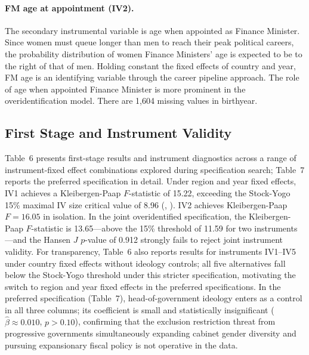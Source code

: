 \documentclass[12pt]{article}
\renewcommand{\citep}[1]{(\textit{\citeauthor{#1}}, \citeyear{#1})}
\begin{document}
\paragraph{FM age at appointment (IV2).}
The secondary instrumental variable is age when appointed as Finance Minister. Since women must queue longer than men to reach their peak political careers, the probability distribution of women Finance Ministers' age is expected to be to the right of that of men. Holding constant the fixed effects of country and year, FM age is an identifying variable through the career pipeline approach. The role of age when appointed Finance Minister is more prominent in the overidentification model. There are 1,604 missing values in birthyear.

\subsection{First Stage and Instrument Validity}

Table~6 presents first-stage results and instrument diagnostics across a range 
of instrument-fixed effect combinations explored during specification search; 
Table~7 reports the preferred specification in detail. Under region and year 
fixed effects, IV1 achieves a Kleibergen-Paap $F$-statistic of 15.22, 
exceeding the Stock-Yogo 15\% maximal IV size critical value of 8.96 
\citep{stock2005}. IV2 achieves Kleibergen-Paap $F = 16.05$ in isolation. 
In the joint overidentified specification, the Kleibergen-Paap $F$-statistic 
is 13.65---above the 15\% threshold of 11.59 for two instruments---and the 
Hansen $J$ $p$-value of 0.912 strongly fails to reject joint instrument 
validity. For transparency, Table~6 also reports results for instruments 
IV1--IV5 under country fixed effects without ideology controls; all five 
alternatives fall below the Stock-Yogo threshold under this stricter 
specification, motivating the switch to region and year fixed effects in the 
preferred specifications. In the preferred specification (Table~7), 
head-of-government ideology enters as a control in all three columns; its 
coefficient is small and statistically insignificant 
($\hat{\beta} \approx 0.010$, $p > 0.10$), confirming that the exclusion 
restriction threat from progressive governments simultaneously expanding 
cabinet gender diversity and pursuing expansionary fiscal policy is not 
operative in the data.


\end{document}
